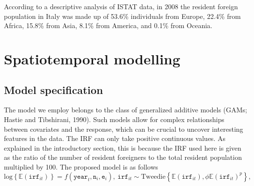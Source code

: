 According to a descriptive analysis of ISTAT data, in 2008 the resident foreign population in Italy was made up of 53.6\% individuals from Europe, 22.4\% from Africa, 15.8\% from Asia, 8.1\% from America, and 0.1\% from Oceania.

\section{Spatiotemporal modelling \label{METH}}

\subsection{Model specification \label{MS}}

The model we employ belongs to the class of generalized additive models (GAMs; Hastie and Tibshirani, 1990). Such models allow for complex relationships between covariates and the response, which can be crucial to uncover interesting features in the data. The IRF can only take positive continuous values. As explained in the introductory section, this is because the IRF used here is given as the ratio of the number of resident foreigners to the total resident population multiplied by 100. The proposed model is as follows
\begin{equation}
\text{log}\left\{\mathbb{E}(\texttt{irf}_{it})\right\} = f(\texttt{year}_t,\texttt{n}_i,\texttt{e}_i), \ \texttt{irf}_{it} \sim \text{Tweedie}\left\{\mathbb{E}(\texttt{irf}_{it}),\phi \mathbb{E}(\texttt{irf}_{it})^{p}\right\},          
\label{PropM}
\end{equation}
